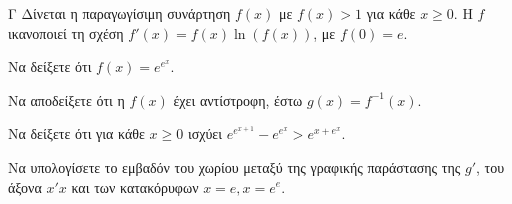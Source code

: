 \begin{thema}{Γ}
Δίνεται η παραγωγίσιμη συνάρτηση $f(x)$ με $f(x) > 1$ για κάθε $x \ge 0$. Η $f$ ικανοποιεί τη σχέση $f'(x) = f(x) \ln(f(x))$, με $f(0) = e$.
\begin{erwthma}
  \item Να δείξετε ότι $f(x) = e^{e^x}$.
  \item Να αποδείξετε ότι η $f(x)$ έχει αντίστροφη, έστω $g(x)=f^{-1}(x)$.
  \item Να δείξετε ότι για κάθε $x \ge 0$ ισχύει $e^{e^{x+1}} - e^{e^x} > e^{x+e^x}$.
  \item Να υπολογίσετε το εμβαδόν του χωρίου μεταξύ της γραφικής παράστασης της $g'$, του άξονα $x'x$ και των κατακόρυφων $x=e, x=e^e$.
\end{erwthma}
\end{thema}

